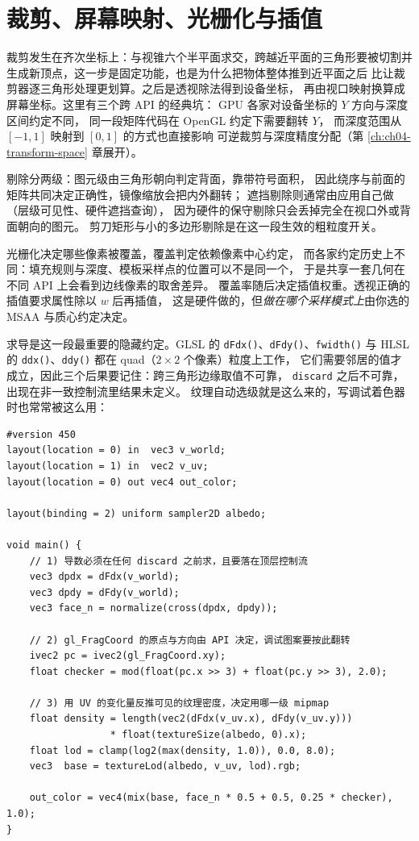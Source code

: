 \documentclass[12pt,a4paper,fontset=fandol]{ctexbook}
\newcommand{\Fn}[1]{\texttt{#1()}}
\newcommand{\Tp}[1]{\texttt{#1}}
\newcommand{\Lang}[1]{\textsf{#1}}
\newcommand{\DomGPU}{\Lang{GPU}}
\newcommand{\GSL}{\Lang{GLSL}}
\newcommand{\HSL}{\Lang{HLSL}}
\begin{document}
\section{裁剪、屏幕映射、光栅化与插值}

裁剪发生在齐次坐标上：与视锥六个半平面求交，跨越近平面的三角形要被切割并
生成新顶点，这一步是固定功能，也是为什么把物体整体推到近平面之后
比让裁剪器逐三角形处理更划算。之后是透视除法得到设备坐标，
再由视口映射换算成屏幕坐标。这里有三个跨 API 的经典坑：
\DomGPU{} 各家对设备坐标的 $Y$ 方向与深度区间约定不同，
同一段矩阵代码在 OpenGL 约定下需要翻转 $Y$，
而深度范围从 $[-1,1]$ 映射到 $[0,1]$ 的方式也直接影响
可逆裁剪与深度精度分配（第 \ref{ch:ch04-transform-space} 章展开）。

剔除分两级：图元级由三角形朝向判定背面，靠带符号面积，
因此绕序与前面的矩阵共同决定正确性，镜像缩放会把内外翻转；
遮挡剔除则通常由应用自己做（层级可见性、硬件遮挡查询），
因为硬件的保守剔除只会丢掉完全在视口外或背面朝向的图元。
剪刀矩形与小的多边形剔除是在这一段生效的粗粒度开关。

光栅化决定哪些像素被覆盖，覆盖判定依赖像素中心约定，
而各家约定历史上不同：填充规则与深度、模板采样点的位置可以不是同一个，
于是共享一套几何在不同 API 上会看到边线像素的取舍差异。
覆盖率随后决定插值权重。透视正确的插值要求属性除以 $w$ 后再插值，
这是硬件做的，但\emph{做在哪个采样模式上}由你选的 MSAA 与质心约定决定。

求导是这一段最重要的隐藏约定。\GSL{} 的 \Fn{dFdx}、\Fn{dFdy}、\Fn{fwidth}
与 \HSL{} 的 \Fn{ddx}、\Fn{ddy} 都在 quad（$2\times2$ 个像素）粒度上工作，
它们需要邻居的值才成立，因此三个后果要记住：跨三角形边缘取值不可靠，
\Tp{discard} 之后不可靠，出现在非一致控制流里结果未定义。
纹理自动选级就是这么来的，写调试着色器时也常常被这么用：

\begin{lstlisting}[style=glslstyle,caption={用屏幕导数估面法线并用 gl\_FragCoord 叠加调试图案},label={lst:ch02-glsl-deriv}]
#version 450
layout(location = 0) in  vec3 v_world;
layout(location = 1) in  vec2 v_uv;
layout(location = 0) out vec4 out_color;

layout(binding = 2) uniform sampler2D albedo;

void main() {
    // 1) 导数必须在任何 discard 之前求，且要落在顶层控制流
    vec3 dpdx = dFdx(v_world);
    vec3 dpdy = dFdy(v_world);
    vec3 face_n = normalize(cross(dpdx, dpdy));

    // 2) gl_FragCoord 的原点与方向由 API 决定，调试图案要按此翻转
    ivec2 pc = ivec2(gl_FragCoord.xy);
    float checker = mod(float(pc.x >> 3) + float(pc.y >> 3), 2.0);

    // 3) 用 UV 的变化量反推可见的纹理密度，决定用哪一级 mipmap
    float density = length(vec2(dFdx(v_uv.x), dFdy(v_uv.y)))
                  * float(textureSize(albedo, 0).x);
    float lod = clamp(log2(max(density, 1.0)), 0.0, 8.0);
    vec3  base = textureLod(albedo, v_uv, lod).rgb;

    out_color = vec4(mix(base, face_n * 0.5 + 0.5, 0.25 * checker), 1.0);
}
\end{lstlisting}
\end{document}

